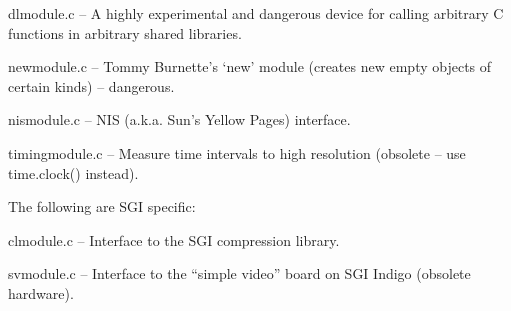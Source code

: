 dlmodule.c --  A highly experimental and dangerous device for calling
arbitrary C functions in arbitrary shared libraries.

newmodule.c -- Tommy Burnette's `new' module (creates new empty
objects of certain kinds) -- dangerous.

nismodule.c -- NIS (a.k.a. Sun's Yellow Pages) interface.

timingmodule.c -- Measure time intervals to high resolution (obsolete
-- use time.clock() instead).

The following are SGI specific:

clmodule.c -- Interface to the SGI compression library.

svmodule.c -- Interface to the ``simple video'' board on SGI Indigo
(obsolete hardware).
